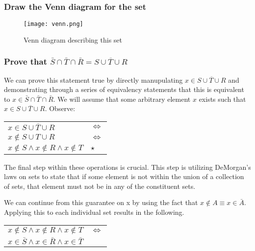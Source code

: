 \newpage
\subsubsection{Draw the Venn diagram for the set}
\begin{figure}[ht]
\texttt{[image: venn.png]}
\caption{Venn diagram describing this set}
\end{figure}

\newcommand{\thecaps}{\bar{S} \cap \bar{T} \cap \bar{R}}
\newcommand{\thecups}{\overline{S \cup T \cup R}}
\subsubsection{Prove that $ \thecaps = \thecups$}

We can prove this statement true by directly manupulating $x \in \thecups$ and demonstrating through a series of equivalency statements that this is equivalent to $x \in \thecaps$. We will assume that some arbitrary
element $x$ exists such that $x \in \thecups$. Observe:

\begin{center}
\begin{tabular}{ll}
    $x \in \thecups$ & $\iff$ \\
    $x \notin S \cup T \cup R$ & $\iff$ \\
    $x \notin S \land x \notin R \land x \notin T$ & $\star$ \\
\end{tabular}
\end{center}

The final step within these operations is crucial. This step is utilizing DeMorgan’s laws on sets to state that if some element is not within the union of a collection of sets, that element must not be in any of the constituent sets.

We can continue from this guarantee on x by using the fact that $x \notin A \equiv x \in \bar{A}$. Applying this to each individual set results in the following.

\begin{center}
\begin{tabular}{ll}
    $x \notin S \land x \notin R \land x \notin T$ & $\iff$ \\
    $x \in \bar{S} \land x \in \bar{R} \land x \in \bar{T}$ \\
\end{tabular}   
\end{center}

